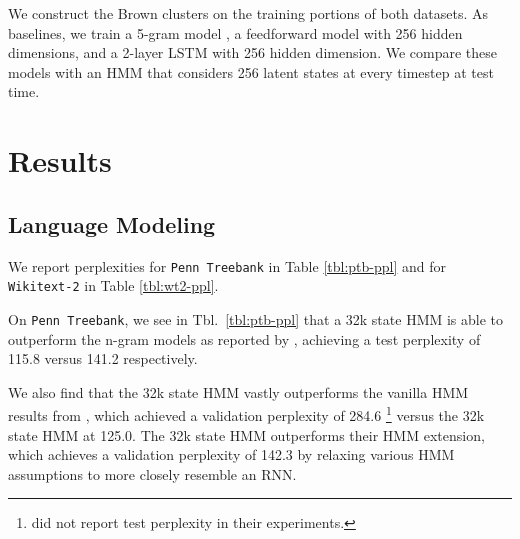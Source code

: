 \documentclass[11pt,a4paper]{article}
\begin{document}
We construct the Brown clusters on the training portions of both datasets.
As baselines, we train a 5-gram model \citep{kenlm},
a feedforward model with 256 hidden dimensions,
and a 2-layer LSTM with 256 hidden dimension.
We compare these models with an HMM that considers 256 latent states
at every timestep at test time.

\begin{comment}
\paragraph{Implementation}
We train two-layer LSTM recurrent neural networks with 256 units,
as well as two-layer feed-forward neural networks with 256 units.
The HMMs we train follow the sparsity constraints outlined in the previous
section with a dropout rate of 0.5,
and we vary the total number of states as well as states per word.
We optimize all models with AdamW \citep{adamw}.

We experimented with a couple batching strategies:
On \texttt{Penn Treebank},
the first strategy discarded the inter-sentence dependencies and shuffled all sentences,
and the second treated the corpus as a single flat document without shuffling.
On \texttt{Wikitext2}, we either shuffled at the document level or treated the corpus as a
single document.
Prior work on both corpuses treated the corpora as single documents.

See Appendix \ref{sec:hyperparams} for the hyperparameters for all models.
\end{comment}

\section{Results}
\subsection{Language Modeling}
We report perplexities 
for \texttt{Penn Treebank} in Table \ref{tbl:ptb-ppl}
and for \texttt{Wikitext-2} in Table \ref{tbl:wt2-ppl}.

On \texttt{Penn Treebank}, we see in Tbl.~\ref{tbl:ptb-ppl}
that a 32k state HMM is able to outperform the n-gram models
as reported by \citet{mikolov2012rnn}, achieving a test perplexity of
115.8 versus 141.2 respectively.

We also find that the 32k state HMM vastly outperforms the vanilla HMM results from \citet{buys2018hmm},
which achieved a validation perplexity of 284.6
\footnote{\citet{buys2018hmm} did not report test perplexity in their experiments.}
versus the 32k state HMM at 125.0.
The 32k state HMM outperforms their HMM extension, which achieves a
validation perplexity of 142.3 by relaxing various HMM assumptions
to more closely resemble an RNN.
\end{document}
